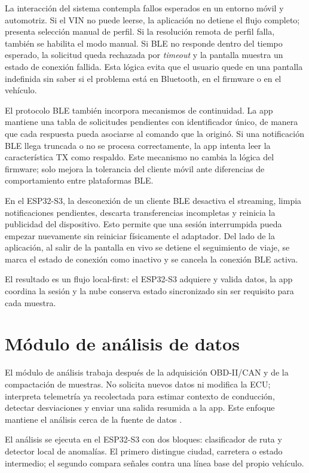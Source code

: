 \documentclass[12pt,letterpaper]{report}
\begin{document}
La interacción del sistema contempla fallos esperados en un entorno móvil y automotriz. Si el VIN no puede leerse, la aplicación no detiene el flujo completo; presenta selección manual de perfil. Si la resolución remota de perfil falla, también se habilita el modo manual. Si BLE no responde dentro del tiempo esperado, la solicitud queda rechazada por \emph{timeout} y la pantalla muestra un estado de conexión fallida. Esta lógica evita que el usuario quede en una pantalla indefinida sin saber si el problema está en Bluetooth, en el firmware o en el vehículo.

El protocolo BLE también incorpora mecanismos de continuidad. La app mantiene una tabla de solicitudes pendientes con identificador único, de manera que cada respuesta pueda asociarse al comando que la originó. Si una notificación BLE llega truncada o no se procesa correctamente, la app intenta leer la característica TX como respaldo. Este mecanismo no cambia la lógica del firmware; solo mejora la tolerancia del cliente móvil ante diferencias de comportamiento entre plataformas BLE.

En el ESP32-S3, la desconexión de un cliente BLE desactiva el streaming, limpia notificaciones pendientes, descarta transferencias incompletas y reinicia la publicidad del dispositivo. Esto permite que una sesión interrumpida pueda empezar nuevamente sin reiniciar físicamente el adaptador. Del lado de la aplicación, al salir de la pantalla en vivo se detiene el seguimiento de viaje, se marca el estado de conexión como inactivo y se cancela la conexión BLE activa.

El resultado es un flujo local-first: el ESP32-S3 adquiere y valida datos, la app coordina la sesión y la nube conserva estado sincronizado sin ser requisito para cada muestra.

\section{Módulo de análisis de datos}

El módulo de análisis trabaja después de la adquisición OBD-II/CAN y de la compactación de muestras. No solicita nuevos datos ni modifica la ECU; interpreta telemetría ya recolectada para estimar contexto de conducción, detectar desviaciones y enviar una salida resumida a la app. Este enfoque mantiene el análisis cerca de la fuente de datos \cite{zhang2020_iov_edge,kalalas2025_ai_driven_monitoring}.

El análisis se ejecuta en el ESP32-S3 con dos bloques: clasificador de ruta y detector local de anomalías. El primero distingue ciudad, carretera o estado intermedio; el segundo compara señales contra una línea base del propio vehículo.
\end{document}
